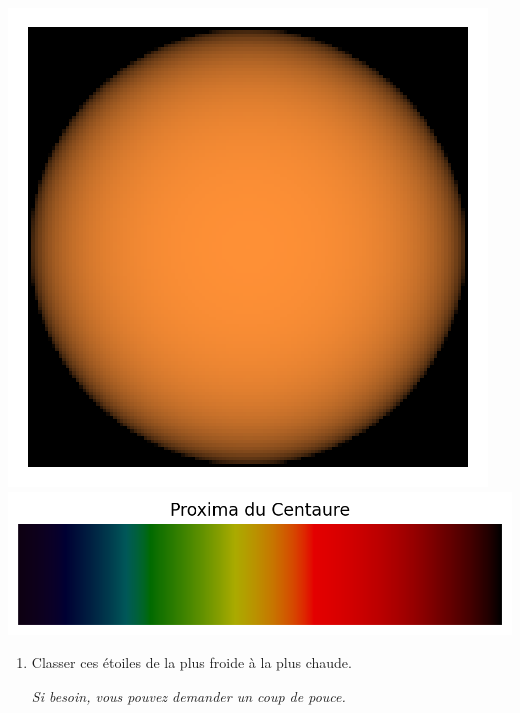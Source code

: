 \documentclass[12pt,a4paper,fleqn]{article}
\newcommand{\thumbsup}{\marginpar{\faThumbsOUp}}
\begin{document}
\begin{center}
\includegraphics[height=\localheight]{images/star_proxima_centauri.png}
\includegraphics[height=\localheight]{images/spectrum_star_proxima_centauri.png}
\end{center}

\begin{enumerate}[resume]
\item \anarai{}

Classer ces étoiles de la plus froide à la plus chaude.

\textit{Si besoin, vous pouvez demander un coup de pouce.} \thumbsup
\end{enumerate}

\begin{center}
\end{center}
\end{document}
